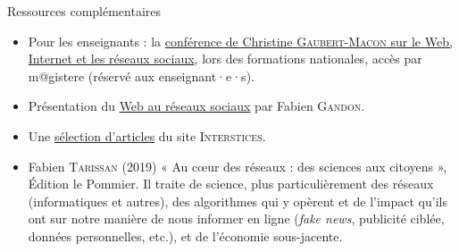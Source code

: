 \vspace{4pt}

\begin{gofurther}{Ressources complémentaires}
\begin{itemize}\jazzitem
\item Pour les enseignants : la \href{https://magistere.education.fr/dgesco/}{conférence de Christine \textsc{Gaubert-Macon} sur le Web, Internet et les réseaux sociaux}, lors des formations nationales, accès par m@gistere (réservé aux enseignant·e·s).
\item Présentation du \href{https://pixees.fr/du-web-aux-reseaux-sociaux/}{Web au réseaux sociaux} par Fabien \textsc{Gandon}.
\item Une \href{https://interstices.info/dossier/snt-reseaux-sociaux/}{sélection d'articles} du site \textsc{Interstices}.
\end{itemize}

\vspace{2pt}
\begin{itemize}\jazzitem
\item Fabien \textsc{Tarissan} (2019) « Au cœur des réseaux : des sciences aux citoyens », Édition le Pommier. Il traite de science, plus particulièrement des réseaux (informatiques et autres), des algorithmes qui y opèrent et de l'impact qu'ils ont sur notre manière de nous informer en ligne (\textit{fake news}, publicité ciblée, données personnelles, etc.), et de l'économie sous-jacente.
\end{itemize}


\end{gofurther}
